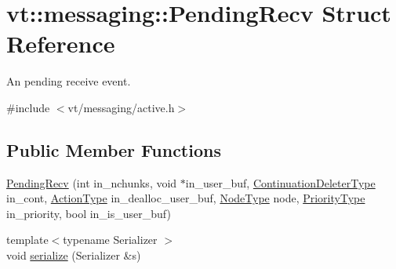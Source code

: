 \hypertarget{structvt_1_1messaging_1_1_pending_recv}{}\section{vt\+:\+:messaging\+:\+:Pending\+Recv Struct Reference}
\label{structvt_1_1messaging_1_1_pending_recv}


An pending receive event.  




{\ttfamily \#include $<$vt/messaging/active.\+h$>$}

\subsection*{Public Member Functions}
\begin{DoxyCompactItemize}
\item 
\hyperlink{structvt_1_1messaging_1_1_pending_recv_ad697905a846ddb4fefb3a7b0348f3a5d}{Pending\+Recv} (int in\+\_\+nchunks, void $\ast$in\+\_\+user\+\_\+buf, \hyperlink{namespacevt_a6de3bd201e2a040be9362d9d24d1e446}{Continuation\+Deleter\+Type} in\+\_\+cont, \hyperlink{namespacevt_ae0a5a7b18cc99d7b732cb4d44f46b0f3}{Action\+Type} in\+\_\+dealloc\+\_\+user\+\_\+buf, \hyperlink{namespacevt_a866da9d0efc19c0a1ce79e9e492f47e2}{Node\+Type} node, \hyperlink{namespacevt_a86bff9f556eb761b27fc8600d006ac04}{Priority\+Type} in\+\_\+priority, bool in\+\_\+is\+\_\+user\+\_\+buf)
\item 
{\footnotesize template$<$typename Serializer $>$ }\\void \hyperlink{structvt_1_1messaging_1_1_pending_recv_ac49714a19453135a9cc1f2d5a0b98af1}{serialize} (Serializer \&s)
\end{DoxyCompactItemize}

